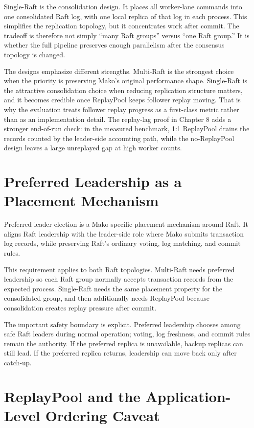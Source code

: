 Single-Raft is the consolidation design. It places all worker-lane commands
into one consolidated Raft log, with one local replica of that log in each
process. This simplifies the replication topology, but it concentrates work
after commit. The tradeoff is therefore not simply ``many Raft groups'' versus
``one Raft group.'' It is whether the full pipeline preserves enough
parallelism after the consensus topology is changed.

The designs emphasize different strengths. Multi-Raft is the strongest choice
when the priority is preserving Mako's original performance shape. Single-Raft
is the attractive consolidation choice when reducing replication structure
matters, and it becomes credible once ReplayPool keeps follower replay moving.
That is why the evaluation treats follower replay progress as a first-class
metric rather than as an implementation detail. The replay-lag proof in
Chapter 8 adds a stronger end-of-run check: in the measured benchmark, 1:1
ReplayPool drains the records counted by the leader-side accounting path,
while the no-ReplayPool design leaves a large unreplayed gap at high worker
counts.

\section{Preferred Leadership as a Placement Mechanism}

Preferred leader election is a Mako-specific placement mechanism around Raft.
It aligns Raft leadership with the leader-side role where Mako submits
transaction log records, while preserving Raft's ordinary voting, log matching,
and commit rules.

This requirement applies to both Raft topologies. Multi-Raft needs preferred
leadership so each Raft group normally accepts transaction records from the
expected process. Single-Raft needs the same placement property for the
consolidated group, and then additionally needs ReplayPool because
consolidation creates replay pressure after commit.

The important safety boundary is explicit. Preferred leadership chooses among
safe Raft leaders during normal operation; voting, log freshness, and commit
rules remain the authority. If the preferred replica is unavailable, backup
replicas can still lead. If the preferred replica returns, leadership can move
back only after catch-up.

\section{ReplayPool and the Application-Level Ordering Caveat}


